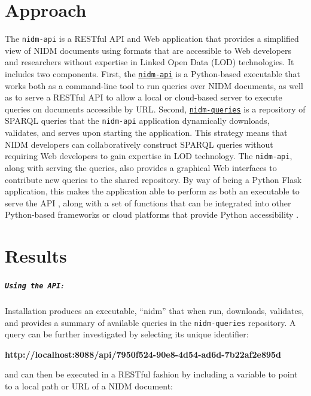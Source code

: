 \documentclass[twocolumn]{bmcart}%
\begin{document}
\section{Approach}\label{approach}
The \texttt{nidm-api} \cite{noauthor_undated-hq} is a RESTful API and Web application that provides a simplified view of NIDM documents using formats that are accessible to Web developers and researchers without expertise in Linked Open Data (LOD) technologies. It includes two components. First, the \href{https://github.com/incf-nidash/nidm-api}{\texttt{nidm-api}} is a Python-based executable that works both as a command-line tool to run queries over NIDM documents, as well as to serve a RESTful API to allow a local or cloud-based server to execute queries on documents accessible by URL. Second, \href{https://github.com/incf-nidash/nidm-queries}{\texttt{nidm-queries}} is a repository of SPARQL queries that the \texttt{nidm-api} application dynamically downloads, validates, and serves upon starting the application. This strategy means that NIDM developers can collaboratively construct SPARQL queries without requiring Web developers to gain expertise in LOD technology. The \texttt{nidm-api}, along with serving the queries, also provides a graphical Web interfaces to contribute new queries to the shared repository. By way of being a Python Flask \cite{noauthor_undated-ia} application, this makes the application able to perform as both an executable to serve the API \cite{noauthor_undated-ii}, along with a set of functions that can be integrated into other Python-based frameworks \cite{noauthor_undated-ej} or cloud platforms that provide Python accessibility \cite{noauthor_undated-jw,Google_undated-aj}. 

\section{Results}\label{results}
\subparagraph{\texorpdfstring{\texttt{Using the API}:}{:}}\label{section}
Installation produces an executable, “nidm” that when run, downloads, validates, and provides a summary of available queries in the \texttt{nidm-queries} repository. A query can be further investigated by selecting its unique identifier: \newline

\textbf{http://localhost:8088/api/7950f524-90e8-4d54-ad6d-7b22af2e895d}\newline

and can then be executed in a RESTful fashion by including a variable to point to a local path or URL of a NIDM document:\newline
\end{document}
